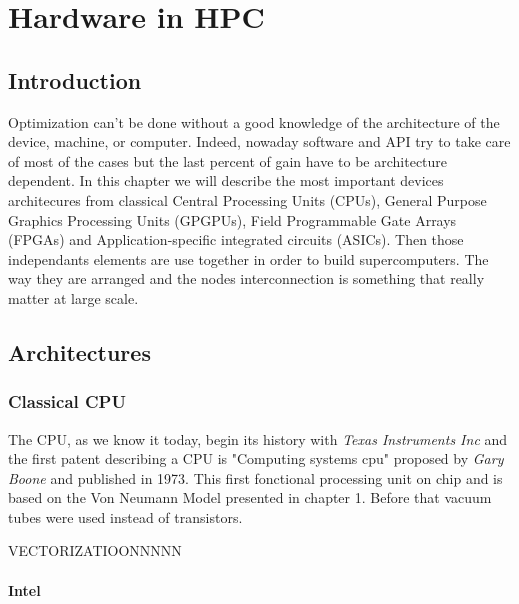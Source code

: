 
\chapter{Hardware in HPC}

\section{Introduction}

Optimization can't be done without a good knowledge of the architecture of the device, machine, or computer. 
Indeed, nowaday software and API try to take care of most of the cases but the last percent of gain have to be architecture dependent. 
In this chapter we will describe the most important devices architecures from classical Central Processing Units (CPUs), General Purpose Graphics Processing Units (GPGPUs), Field Programmable Gate Arrays (FPGAs) and Application-specific integrated circuits (ASICs).
Then those independants elements are use together in order to build supercomputers. 
The way they are arranged and the nodes interconnection is something that really matter at large scale.  

\section{Architectures}
\subsection{Classical CPU}

The CPU, as we know it today, begin its history with \textit{Texas Instruments Inc} and the first patent describing a CPU is "Computing systems cpu" proposed by \textit{Gary Boone} and published in 1973.
This first fonctional processing unit on chip and is based on the Von Neumann Model presented in chapter 1.
Before that vacuum tubes were used instead of transistors.



VECTORIZATIOONNNNN

\subsubsection{Intel}

